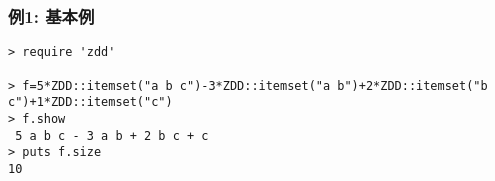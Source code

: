 \subsubsection*{例1: 基本例}



\begin{Verbatim}[baselinestretch=0.7,frame=single]
> require 'zdd'

> f=5*ZDD::itemset("a b c")-3*ZDD::itemset("a b")+2*ZDD::itemset("b c")+1*ZDD::itemset("c")
> f.show
 5 a b c - 3 a b + 2 b c + c
> puts f.size
10
\end{Verbatim}
